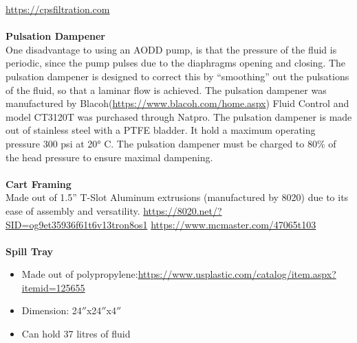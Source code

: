 \url{  https://cpsfiltration.com}\\
\\
\textbf{Pulsation Dampener}\\
One disadvantage to using an AODD pump, is that the pressure of the fluid is periodic, since the pump pulses due to the diaphragms opening and closing. The pulsation dampener is designed to correct this by “smoothing” out the pulsations of the fluid, so that a laminar flow is achieved. The pulsation dampener was manufactured by Blacoh(\url{https://www.blacoh.com/home.aspx}) Fluid Control and  model CT3120T was purchased through Natpro. The pulsation dampener is made out of stainless steel with a PTFE bladder.  It hold a maximum operating pressure 300 psi at \ang{20} C. The pulsation dampener must be charged to 80$\%$ of the head pressure to ensure maximal dampening.\\
\\
\textbf{Cart Framing}\\
Made out of 1.5” T-Slot Aluminum extrusions (manufactured by 8020) due to its ease of assembly and versatility. 
\url{https://8020.net/?SID=og9et35936f61t6v13tron8os1}
\url{https://www.mcmaster.com/47065t103}    \\
\\
\textbf{Spill Tray}
\begin{itemize}
\item Made out of polypropylene:\url{https://www.usplastic.com/catalog/item.aspx?itemid=125655}
\item Dimension: 24$''$x24$''$x4$''$
\item Can hold 37 litres of fluid
\end{itemize}



 














